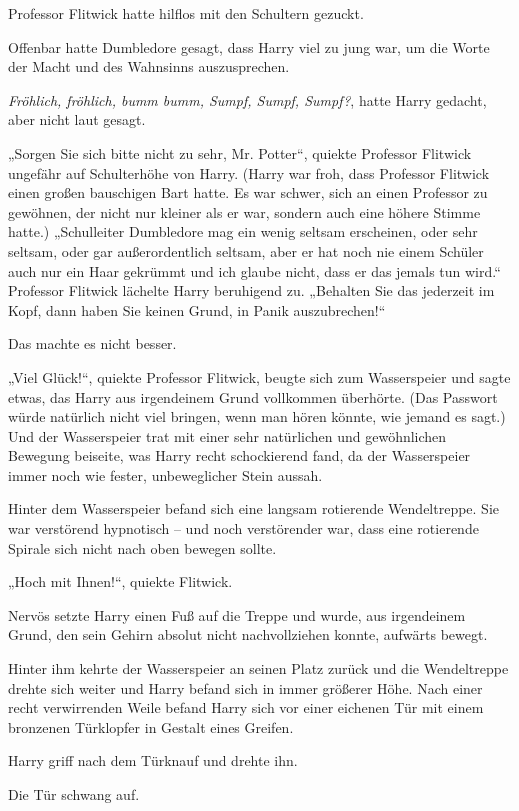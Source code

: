 {Professor Flitwick hatte hilflos mit den Schultern gezuckt.

Offenbar hatte Dumbledore gesagt, dass Harry viel zu jung war, um die Worte der Macht und des Wahnsinns auszusprechen.

\emph{Fröhlich, fröhlich, bumm bumm, Sumpf, Sumpf, Sumpf?}, hatte Harry gedacht, aber nicht laut gesagt.

„Sorgen Sie sich bitte nicht zu sehr, Mr. Potter“, quiekte Professor Flitwick ungefähr auf Schulterhöhe von Harry. (Harry war froh, dass Professor Flitwick einen großen bauschigen Bart hatte. Es war schwer, sich an einen Professor zu gewöhnen, der nicht nur kleiner als er war, sondern auch eine höhere Stimme hatte.) „Schulleiter Dumbledore mag ein wenig seltsam erscheinen, oder sehr seltsam, oder gar außerordentlich seltsam, aber er hat noch nie einem Schüler auch nur ein Haar gekrümmt und ich glaube nicht, dass er das jemals tun wird.“ Professor Flitwick lächelte Harry beruhigend zu. „Behalten Sie das jederzeit im Kopf, dann haben Sie keinen Grund, in Panik auszubrechen!“

Das machte es nicht besser.

„Viel Glück!“, quiekte Professor Flitwick, beugte sich zum Wasserspeier und sagte etwas, das Harry aus irgendeinem Grund vollkommen überhörte. (Das Passwort würde natürlich nicht viel bringen, wenn man hören könnte, wie jemand es sagt.) Und der Wasserspeier trat mit einer sehr natürlichen und gewöhnlichen Bewegung beiseite, was Harry recht schockierend fand, da der Wasserspeier immer noch wie fester, unbeweglicher Stein aussah.

Hinter dem Wasserspeier befand sich eine langsam rotierende Wendeltreppe. Sie war verstörend hypnotisch -- und noch verstörender war, dass eine rotierende Spirale sich nicht nach oben bewegen sollte.

„Hoch mit Ihnen!“, quiekte Flitwick.

Nervös setzte Harry einen Fuß auf die Treppe und wurde, aus irgendeinem Grund, den sein Gehirn absolut nicht nachvollziehen konnte, aufwärts bewegt.

Hinter ihm kehrte der Wasserspeier an seinen Platz zurück und die Wendeltreppe drehte sich weiter und Harry befand sich in immer größerer Höhe. Nach einer recht verwirrenden Weile befand Harry sich vor einer eichenen Tür mit einem bronzenen Türklopfer in Gestalt eines Greifen.

Harry griff nach dem Türknauf und drehte ihn.

Die Tür schwang auf.

}
